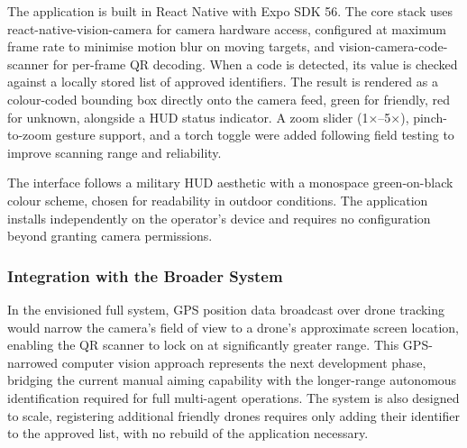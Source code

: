 \documentclass[conference]{IEEEtran}
\begin{document}
The application is built in React Native with Expo SDK 56. The core stack uses react-native-vision-camera for camera hardware access, configured at maximum frame rate to minimise motion blur on moving targets, and
vision-camera-code-scanner for per-frame QR decoding. When a code is detected, its value is checked against a locally stored list of approved identifiers. The result is rendered as a colour-coded bounding box directly onto the camera feed, green for friendly, red for unknown, alongside a HUD status indicator. A zoom slider (1×--5×), pinch-to-zoom gesture support, and a torch toggle were added following field testing to
improve scanning range and reliability.

The interface follows a military HUD aesthetic with a monospace green-on-black colour scheme, chosen for readability in outdoor conditions. The application installs independently on the operator's device and requires no configuration beyond granting camera permissions.

%

\subsubsection*{Integration with the Broader System}

In the envisioned full system, GPS position data broadcast over drone tracking would narrow the camera's field of view to a drone's approximate screen location, enabling the QR scanner to lock on at significantly
greater range. This GPS-narrowed computer vision approach represents the next development phase, bridging the current manual aiming capability
with the longer-range autonomous identification required for full multi-agent operations. The system is also designed to scale, registering additional friendly drones requires only adding their identifier to the
approved list, with no rebuild of the application necessary.



\end{document}
